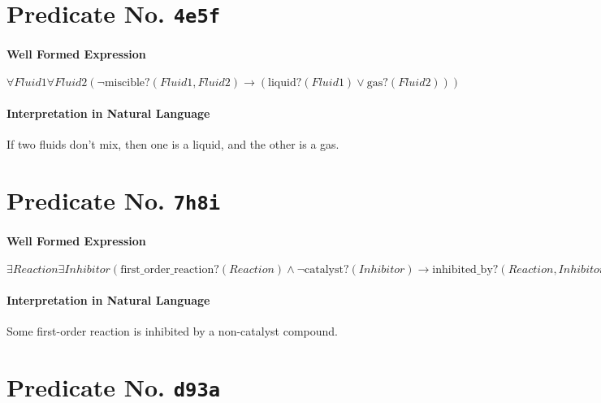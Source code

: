 \documentclass[11pt]{article}
\begin{document}
\section{Predicate No. \texttt{4e5f}}
\label{sec:org9041fe1}

\paragraph*{Well Formed Expression}
\label{sec:orge9caf1a}

\(\forall \mathit{Fluid1} \forall \mathit{Fluid2} (\neg \mathrm{miscible?}(\mathit{Fluid1}, \mathit{Fluid2}) \rightarrow (\mathrm{liquid?}(\mathit{Fluid1}) \lor \mathrm{gas?}(\mathit{Fluid2})))\)

\paragraph*{Interpretation in Natural Language}
\label{sec:org04597e6}

If two fluids don't mix, then one is a liquid, and the other is a gas.



\section{Predicate No. \texttt{7h8i}}
\label{sec:orgc2419dd}

\paragraph*{Well Formed Expression}
\label{sec:orga522ee1}

\(\exists \mathit{Reaction} \exists \mathit{Inhibitor} (\mathrm{first\_order\_reaction?}(\mathit{Reaction}) \land \neg \mathrm{catalyst?}(\mathit{Inhibitor}) \rightarrow \mathrm{inhibited\_by?}(\mathit{Reaction}, \mathit{Inhibitor}))\)

\paragraph*{Interpretation in Natural Language}
\label{sec:org1486b05}

Some first-order reaction is inhibited by a non-catalyst compound.



\section{Predicate No. \texttt{d93a}}
\label{sec:org1966a8e}
\end{document}
